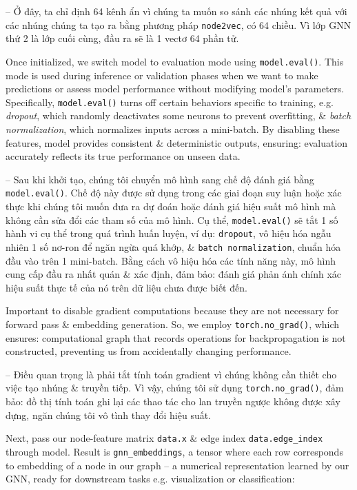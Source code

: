 \documentclass{article}
\begin{document}
\begin{itemize}
\begin{itemize}
\begin{itemize}
\begin{itemize}
               -- Ở đây, ta chỉ định 64 kênh ẩn vì chúng ta muốn so sánh các nhúng kết quả với các nhúng chúng ta tạo ra bằng phương pháp {\tt node2vec}, có 64 chiều. Vì lớp GNN thứ 2 là lớp cuối cùng, đầu ra sẽ là 1 vectơ 64 phần tử.

               Once initialized, we switch model to evaluation mode using {\tt model.eval()}. This mode is used during inference or validation phases when we want to make predictions or assess model performance without modifying model's parameters. Specifically, {\tt model.eval()} turns off certain behaviors specific to training, e.g. {\it dropout}, which randomly deactivates some neurons to prevent overfitting, \& {\it batch normalization}, which normalizes inputs across a mini-batch. By disabling these features, model provides consistent \& deterministic outputs, ensuring: evaluation accurately reflects its true performance on unseen data.

               -- Sau khi khởi tạo, chúng tôi chuyển mô hình sang chế độ đánh giá bằng {\tt model.eval()}. Chế độ này được sử dụng trong các giai đoạn suy luận hoặc xác thực khi chúng tôi muốn đưa ra dự đoán hoặc đánh giá hiệu suất mô hình mà không cần sửa đổi các tham số của mô hình. Cụ thể, {\tt model.eval()} sẽ tắt 1 số hành vi cụ thể trong quá trình huấn luyện, ví dụ: {\tt dropout}, vô hiệu hóa ngẫu nhiên 1 số nơ-ron để ngăn ngừa quá khớp, \& {\tt batch normalization}, chuẩn hóa đầu vào trên 1 mini-batch. Bằng cách vô hiệu hóa các tính năng này, mô hình cung cấp đầu ra nhất quán \& xác định, đảm bảo: đánh giá phản ánh chính xác hiệu suất thực tế của nó trên dữ liệu chưa được biết đến.

               Important to disable gradient computations because they are not necessary for forward pass \& embedding generation. So, we employ \verb|torch.no_grad()|, which ensures: computational graph that records operations for backpropagation is not constructed, preventing us from accidentally changing performance.

               -- Điều quan trọng là phải tắt tính toán gradient vì chúng không cần thiết cho việc tạo nhúng \& truyền tiếp. Vì vậy, chúng tôi sử dụng \verb|torch.no_grad()|, đảm bảo: đồ thị tính toán ghi lại các thao tác cho lan truyền ngược không được xây dựng, ngăn chúng tôi vô tình thay đổi hiệu suất.

               Next, pass our node-feature matrix {\tt data.x} \& edge index \verb|data.edge_index| through model. Result is \verb|gnn_embeddings|, a tensor where each row corresponds to embedding of a node in our graph -- a numerical representation learned by our GNN, ready for downstream tasks e.g. visualization or classification:


\end{itemize}
\end{itemize}
\end{itemize}
\end{itemize}
\end{document}
